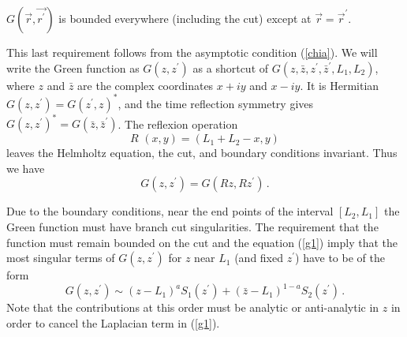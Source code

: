 \documentclass[a4paper]{article}
\begin{document}
 $G(\vec{r},\vec{r^\prime})$ is bounded everywhere (including the cut) except at $\vec{r}=\vec{r}^{\prime}$.

\smallskip
\noindent This last requirement follows from the asymptotic condition (\ref{chia}).  
We will write the Green function as $G(z,z^{\prime})$ as a
shortcut of $G(z,\bar{z},z^{\prime},\bar{z}^{\prime},L_{1},L_{2})$,
where $z$ and $\bar{z}$ are the complex coordinates $x+iy$ and $x-iy$. 
It is Hermitian  $
G(z,z^{\prime})=G(z^{\prime},z)^{*}$, 
 and the time reflection symmetry gives $
G(z,z^{\prime})^{*}=G(\bar{z},\bar{z}^{\prime})$. 
 The
reflexion operation 
\begin{equation}
R\,\,(x,y)=(L_{1}+L_{2}-x,y) \label{refle}
\end{equation}
leaves the Helmholtz equation, the cut, and boundary conditions invariant. Thus we have 
\begin{equation}
G(z,z^{\prime})=G(Rz,Rz^{\prime})\,. \label{sime}
\end{equation}

Due to the boundary conditions, near the end points of the interval $[L_{2},L_{1}]$ the Green function must
have branch cut singularities. The requirement that
the function must remain bounded on the cut and the equation (\ref{g1})
imply that the most singular terms of $G(z,z^{\prime})$ for $z$ near $
L_{1}$ (and fixed $z^{\prime}$) have to be of the form
\begin{equation}
G(z,z^{\prime})\sim (z-L_{1})^{a }S_{1}(z^{\prime})+(\bar{z}
-L_{1})^{1-a }S_{2}(z^{\prime}) \,. \label{equ2}
\end{equation}
 Note that the contributions at this order must be  
analytic or anti-analytic in $z$ in
order to cancel the Laplacian term in (\ref{g1}).
\end{document}
